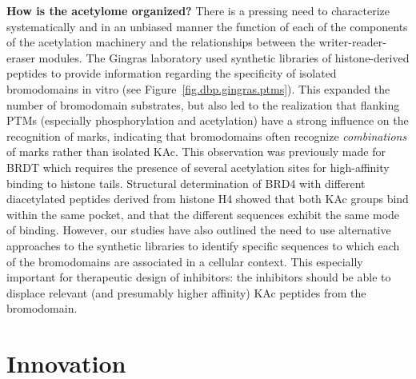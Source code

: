 \documentclass[arial,11pt]{article}
\newcommand{\NeedRevision}[1]{\textcolor{red}{#1}}
\begin{document}
{\bf How is the acetylome organized?} There is a pressing need to characterize systematically and in an unbiased manner the function of each of the components of the acetylation machinery and the relationships between the writer-reader-eraser modules. %
The Gingras laboratory used synthetic libraries of histone-derived peptides to provide information regarding the specificity of isolated bromodomains in vitro (see Figure~\ref{fig.dbp.gingras.ptms}). This expanded the number of bromodomain substrates, but also led to the realization that flanking PTMs (especially phosphorylation and acetylation) have a strong influence on the recognition of marks, indicating that bromodomains often recognize {\em combinations} of marks rather than isolated KAc. This observation was previously made for BRDT which requires the presence of several acetylation sites for high-affinity binding to histone tails. Structural determination of BRD4 with different diacetylated peptides derived from histone H4 showed that both KAc groups bind within the same pocket, and that the different sequences exhibit the same mode of binding. However, our studies have also outlined the need to use alternative approaches to the synthetic libraries to identify specific sequences to which each of the bromodomains are associated in a cellular context. This especially important for therapeutic design of inhibitors: the inhibitors should be able to displace relevant (and presumably higher affinity) KAc peptides from the bromodomain.

\section{Innovation}

\end{document}

